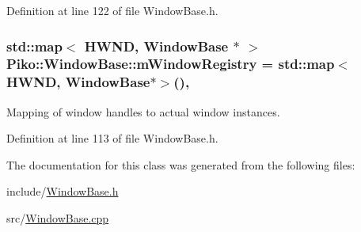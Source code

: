 Definition at line 122 of file Window\-Base.\-h.

\hypertarget{class_piko_1_1_window_base_a1adb16f8e85e4e461b57199e81b0c675}{
\subsubsection[{m\-Window\-Registry}]{\setlength{\rightskip}{0pt plus 5cm}std\-::map$<$ H\-W\-N\-D, {\bf Window\-Base} $\ast$ $>$ Piko\-::\-Window\-Base\-::m\-Window\-Registry = std\-::map$<$H\-W\-N\-D, {\bf Window\-Base}$\ast$$>$()\hspace{0.3cm}{\ttfamily [static]}, {\ttfamily [private]}}}\label{d5/d35/class_piko_1_1_window_base_a1adb16f8e85e4e461b57199e81b0c675}
Mapping of window handles to actual window instances. 

Definition at line 113 of file Window\-Base.\-h.



The documentation for this class was generated from the following files\-:\begin{DoxyCompactItemize}
\item 
include/\hyperlink{_window_base_8h}{Window\-Base.\-h}\item 
src/\hyperlink{_window_base_8cpp}{Window\-Base.\-cpp}\end{DoxyCompactItemize}
